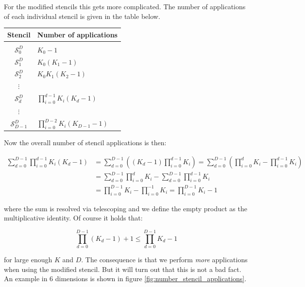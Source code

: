 For the modified stencils this gets more complicated. The number of applications
of each individual stencil is given in the table below.

\begin{center}
\begin{tabular}{cl}
  Stencil            & Number of applications \\
  \hline \\
  $\mathcal{S}^D_0$ & $K_0-1$ \\
  $\mathcal{S}^D_1$ & $K_0 (K_1-1)$ \\
  $\mathcal{S}^D_2$ & $K_0 K_1 (K_2-1)$ \\
  $\vdots$ & \\
  $\mathcal{S}^D_{d}$ & $\prod_{i=0}^{d-1} K_i (K_d-1)$ \\
  $\vdots$ & \\
  $\mathcal{S}^D_{D-1}$ & $\prod_{i=0}^{D-2} K_i (K_{D-1}-1)$
\end{tabular}
\end{center}

Now the overall number of stencil applications is then:

\begin{align*}
  \sum_{d=0}^{D-1} \prod_{i=0}^{d-1} K_i (K_d-1)
  & = \sum_{d=0}^{D-1} \left((K_d-1) \prod_{i=0}^{d-1} K_i \right)
   = \sum_{d=0}^{D-1} \left( \prod_{i=0}^{d} K_i - \prod_{i=0}^{d-1} K_i \right) \\
  & = \sum_{d=0}^{D-1} \prod_{i=0}^{d} K_i - \sum_{d=0}^{D-1} \prod_{i=0}^{d-1} K_i \\
  & = \prod_{i=0}^{D-1} K_i - \prod_{i=0}^{-1} K_i = \prod_{i=0}^{D-1} K_i -1
\end{align*}

where the sum is resolved via telescoping and we define the empty product
as the multiplicative identity. Of course it holds that:

\begin{equation*}
  \prod_{d=0}^{D-1} (K_d -1) +1 \leq \prod_{d=0}^{D-1} K_d -1
\end{equation*}

for large enough $K$ and $D$. The consequence is that we perform \emph{more}
applications when using the modified stencil. But it will turn out that this
is not a bad fact. An example in 6 dimensions is shown in figure \ref{fig:number_stencil_applications}.

